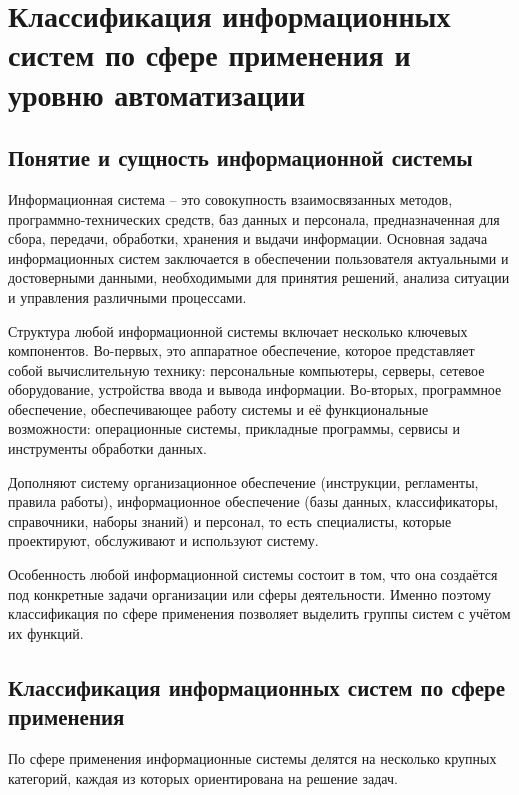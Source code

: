\documentclass{ou}
\begin{document}
\section{}
\section{}
\section{Классификация информационных систем по сфере применения и уровню автоматизации}
\subsection{Понятие и сущность информационной системы}
Информационная система -- это совокупность взаимосвязанных методов, программно-технических средств, баз данных и персонала, предназначенная для сбора, передачи, обработки, хранения и выдачи информации. Основная задача информационных систем заключается в обеспечении пользователя актуальными и достоверными данными, необходимыми для принятия решений, анализа ситуации и управления различными процессами.

Структура любой информационной системы включает несколько ключевых компонентов. Во-первых, это аппаратное обеспечение, которое представляет собой вычислительную технику: персональные компьютеры, серверы, сетевое оборудование, устройства ввода и вывода информации. Во-вторых, программное обеспечение, обеспечивающее работу системы и её функциональные возможности: операционные системы, прикладные программы, сервисы и инструменты обработки данных.

Дополняют систему организационное обеспечение (инструкции, регламенты, правила работы), информационное обеспечение (базы данных, классификаторы, справочники, наборы знаний) и персонал, то есть специалисты, которые проектируют, обслуживают и используют систему.

Особенность любой информационной системы состоит в том, что она создаётся под конкретные задачи организации или сферы деятельности. Именно поэтому классификация по сфере применения позволяет выделить группы систем с учётом их функций.
\subsection{Классификация информационных систем по сфере применения}
По сфере применения информационные системы делятся на несколько крупных категорий, каждая из которых ориентирована на решение задач.
\end{document}
